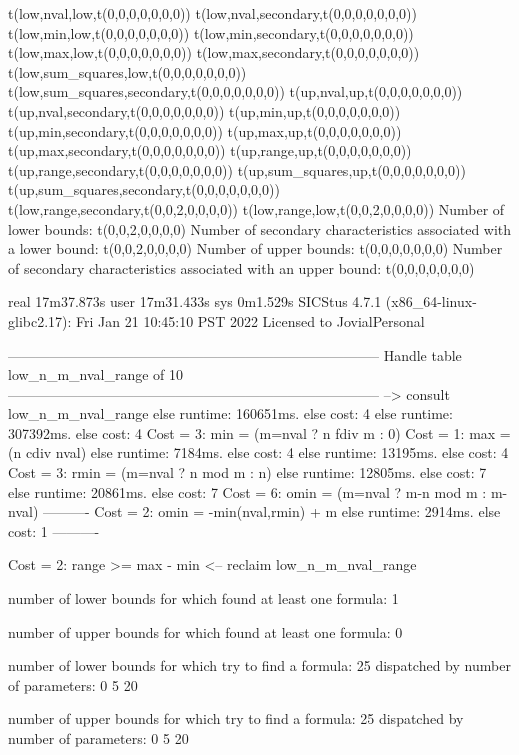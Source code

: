 t(low,nval,low,t(0,0,0,0,0,0,0))
t(low,nval,secondary,t(0,0,0,0,0,0,0))
t(low,min,low,t(0,0,0,0,0,0,0))
t(low,min,secondary,t(0,0,0,0,0,0,0))
t(low,max,low,t(0,0,0,0,0,0,0))
t(low,max,secondary,t(0,0,0,0,0,0,0))
t(low,sum_squares,low,t(0,0,0,0,0,0,0))
t(low,sum_squares,secondary,t(0,0,0,0,0,0,0))
t(up,nval,up,t(0,0,0,0,0,0,0))
t(up,nval,secondary,t(0,0,0,0,0,0,0))
t(up,min,up,t(0,0,0,0,0,0,0))
t(up,min,secondary,t(0,0,0,0,0,0,0))
t(up,max,up,t(0,0,0,0,0,0,0))
t(up,max,secondary,t(0,0,0,0,0,0,0))
t(up,range,up,t(0,0,0,0,0,0,0))
t(up,range,secondary,t(0,0,0,0,0,0,0))
t(up,sum_squares,up,t(0,0,0,0,0,0,0))
t(up,sum_squares,secondary,t(0,0,0,0,0,0,0))
t(low,range,secondary,t(0,0,2,0,0,0,0))
t(low,range,low,t(0,0,2,0,0,0,0))
Number of lower bounds:                                             t(0,0,2,0,0,0,0)
Number of secondary characteristics associated with a lower bound:  t(0,0,2,0,0,0,0)
Number of upper bounds:                                             t(0,0,0,0,0,0,0)
Number of secondary characteristics associated with an upper bound: t(0,0,0,0,0,0,0)

real	17m37.873s
user	17m31.433s
sys	0m1.529s
SICStus 4.7.1 (x86_64-linux-glibc2.17): Fri Jan 21 10:45:10 PST 2022
Licensed to JovialPersonal


--------------------------------------------------------------------------------
Handle table low_n_m_nval_range of 10
--------------------------------------------------------------------------------
--> consult low_n_m_nval_range
else runtime: 160651ms. else cost: 4
else runtime: 307392ms. else cost: 4
Cost =  3:  min  = (m=nval ? n fdiv m : 0) %
Cost =  1:  max  = (n cdiv nval)
else runtime: 7184ms. else cost: 4
else runtime: 13195ms. else cost: 4
Cost =  3:  rmin = (m=nval ? n mod m : n) %
else runtime: 12805ms. else cost: 7
else runtime: 20861ms. else cost: 7
Cost =  6:  omin = (m=nval ? m-n mod m : m-nval) %
----------
Cost =  2:  omin = -min(nval,rmin) + m
else runtime: 2914ms. else cost: 1
----------

Cost =  2:  range >= max - min
<-- reclaim low_n_m_nval_range

number of lower bounds for which found at least one formula: 1

number of upper bounds for which found at least one formula: 0

number of lower bounds for which try to find a formula: 25
dispatched by number of parameters: 0  5  20

number of upper bounds for which try to find a formula: 25
dispatched by number of parameters: 0  5  20

